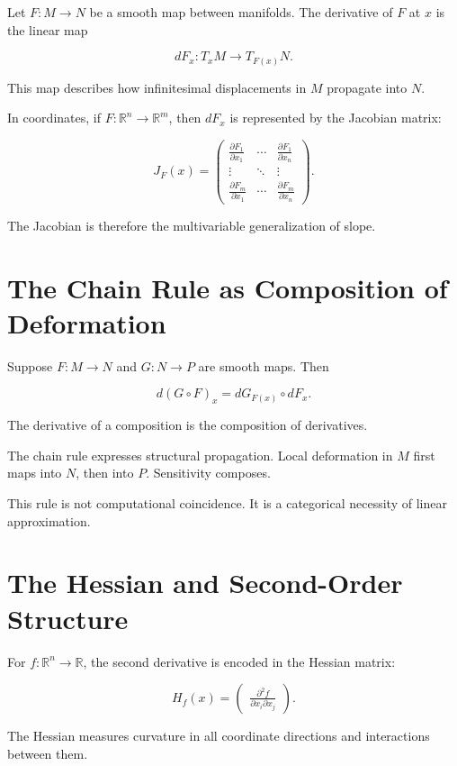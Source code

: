 \documentclass[12pt]{book}
\begin{document}
Let $F : M \to N$ be a smooth map between manifolds. The derivative of $F$ at $x$ is the linear map

\[
dF_x : T_x M \to T_{F(x)} N.
\]

This map describes how infinitesimal displacements in $M$ propagate into $N$.

In coordinates, if $F : \mathbb{R}^n \to \mathbb{R}^m$, then $dF_x$ is represented by the Jacobian matrix:

\[
J_F(x) =
\begin{pmatrix}
\frac{\partial F_1}{\partial x_1} & \cdots & \frac{\partial F_1}{\partial x_n} \\
\vdots & \ddots & \vdots \\
\frac{\partial F_m}{\partial x_1} & \cdots & \frac{\partial F_m}{\partial x_n}
\end{pmatrix}.
\]

The Jacobian is therefore the multivariable generalization of slope.

\section{The Chain Rule as Composition of Deformation}

Suppose $F : M \to N$ and $G : N \to P$ are smooth maps. Then

\[
d(G \circ F)_x = dG_{F(x)} \circ dF_x.
\]

The derivative of a composition is the composition of derivatives.

The chain rule expresses structural propagation. Local deformation in $M$ first maps into $N$, then into $P$. Sensitivity composes.

This rule is not computational coincidence. It is a categorical necessity of linear approximation.

\section{The Hessian and Second-Order Structure}

For $f : \mathbb{R}^n \to \mathbb{R}$, the second derivative is encoded in the Hessian matrix:

\[
H_f(x) =
\begin{pmatrix}
\frac{\partial^2 f}{\partial x_i \partial x_j}
\end{pmatrix}.
\]

The Hessian measures curvature in all coordinate directions and interactions between them.
\end{document}
